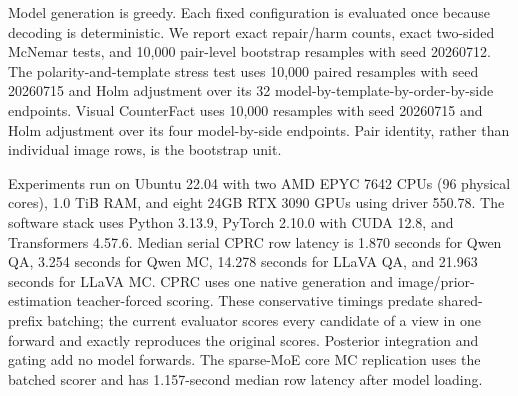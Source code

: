\documentclass[letterpaper]{article}
\begin{document}
Model generation is greedy. Each fixed configuration is evaluated once because
decoding is deterministic. We report exact repair/harm counts, exact two-sided
McNemar tests, and 10,000 pair-level bootstrap resamples with seed 20260712.
The polarity-and-template stress test uses 10,000 paired resamples with seed
20260715 and Holm adjustment over its 32 model-by-template-by-order-by-side
endpoints. Visual CounterFact uses 10,000 resamples with seed 20260715 and Holm
adjustment over its four model-by-side endpoints. Pair identity, rather than
individual image rows, is the bootstrap unit.

Experiments run on Ubuntu 22.04 with two AMD EPYC 7642 CPUs (96 physical cores),
1.0 TiB RAM, and eight 24GB RTX 3090 GPUs using driver 550.78. The software stack
uses Python 3.13.9, PyTorch 2.10.0 with CUDA 12.8, and Transformers 4.57.6. Median
serial CPRC row latency is 1.870 seconds for Qwen QA, 3.254 seconds for Qwen MC,
14.278 seconds for LLaVA QA, and 21.963 seconds for LLaVA MC. CPRC uses one
native generation and image/prior-estimation teacher-forced scoring. These conservative
timings predate shared-prefix batching; the current evaluator scores every
candidate of a view in one forward and exactly reproduces the original scores.
Posterior integration and gating add no model forwards.
The sparse-MoE core MC replication uses the batched scorer and has 1.157-second
median row latency after model loading.


\end{document}
